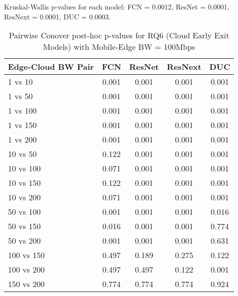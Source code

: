 \begin{table}[h]
\centering
\caption{Pairwise Conover post-hoc p-values for RQ6 (Cloud Early Exit Models) with Mobile-Edge BW = 100Mbps}
\label{tab:conover_cloud_earlyexit_me100}
\smallskip
Kruskal-Wallis p-values for each model: FCN = 0.0012, ResNet = 0.0001, ResNext = 0.0001, DUC = 0.0003.

\begin{tabular}{lcccc}
\toprule
Edge-Cloud BW Pair & FCN & ResNet & ResNext & DUC \\
\midrule
1 vs 10 & 0.001 & 0.001 & 0.001 & 0.001 \\
1 vs 50 & 0.001 & 0.001 & 0.001 & 0.001 \\
1 vs 100 & 0.001 & 0.001 & 0.001 & 0.001 \\
1 vs 150 & 0.001 & 0.001 & 0.001 & 0.001 \\
1 vs 200 & 0.001 & 0.001 & 0.001 & 0.001 \\
10 vs 50 & 0.122 & 0.001 & 0.001 & 0.001 \\
10 vs 100 & 0.071 & 0.001 & 0.001 & 0.001 \\
10 vs 150 & 0.122 & 0.001 & 0.001 & 0.001 \\
10 vs 200 & 0.071 & 0.001 & 0.001 & 0.001 \\
50 vs 100 & 0.001 & 0.001 & 0.001 & 0.016 \\
50 vs 150 & 0.016 & 0.001 & 0.001 & 0.774 \\
50 vs 200 & 0.001 & 0.001 & 0.001 & 0.631 \\
100 vs 150 & 0.497 & 0.189 & 0.275 & 0.122 \\
100 vs 200 & 0.497 & 0.497 & 0.122 & 0.001 \\
150 vs 200 & 0.774 & 0.774 & 0.774 & 0.924 \\
\bottomrule
\end{tabular}
\end{table}

